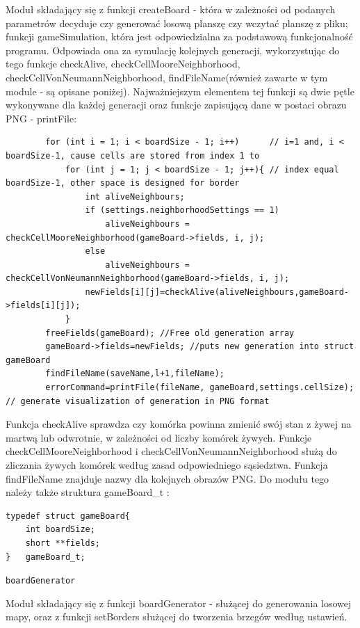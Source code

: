 \documentclass[a4paper,12pt,twoside]{article}
\newcommand{\prog}{\texttt}
\begin{document}
  \hspace{1.5cm} Moduł składający się z funkcji createBoard - która w zależności od podanych parametrów decyduje czy generować losową planszę czy wczytać planszę z pliku; funkcji gameSimulation, która jest odpowiedzialna za podstawową funkcjonalność programu. Odpowiada ona za symulację kolejnych generacji, wykorzystując do tego funkcje checkAlive, checkCellMooreNeighborhood, checkCellVonNeumannNeighborhood, findFileName(również zawarte w tym module - są opisane poniżej). Najważniejszym elementem tej funkcji są dwie pętle wykonywane dla każdej generacji oraz funkcje zapisującą dane w postaci obrazu PNG - printFile:
  \begin{lstlisting}
        for (int i = 1; i < boardSize - 1; i++)      // i=1 and, i < boardSize-1, cause cells are stored from index 1 to 
            for (int j = 1; j < boardSize - 1; j++){ // index equal boardSize-1, other space is designed for border
                int aliveNeighbours;
                if (settings.neighborhoodSettings == 1)
                    aliveNeighbours = checkCellMooreNeighborhood(gameBoard->fields, i, j);
                else
                    aliveNeighbours = checkCellVonNeumannNeighborhood(gameBoard->fields, i, j);
                newFields[i][j]=checkAlive(aliveNeighbours,gameBoard->fields[i][j]);
            }
        freeFields(gameBoard); //Free old generation array
        gameBoard->fields=newFields; //puts new generation into struct gameBoard
        findFileName(saveName,l+1,fileName);
        errorCommand=printFile(fileName, gameBoard,settings.cellSize); // generate visualization of generation in PNG format
\end{lstlisting}
Funkcja checkAlive sprawdza czy komórka powinna zmienić swój stan  z żywej na martwą lub odwrotnie, w zależności od liczby komórek żywych.
Funkcje checkCellMooreNeighborhood i checkCellVonNeumannNeighborhood służą do zliczania żywych komórek według zasad odpowiedniego sąsiedztwa.
Funkcja findFileName znajduje nazwy dla kolejnych obrazów PNG.
Do modułu tego należy także struktura gameBoard\_t :
\begin{lstlisting}
typedef struct gameBoard{
    int boardSize;
    short **fields;
}   gameBoard_t;
\end{lstlisting}
  \prog{boardGenerator} 

  \hspace{1.5cm} Moduł składający się z funkcji boardGenerator - służącej do generowania losowej mapy, oraz z funkcji setBorders służącej do tworzenia brzegów według ustawień.
\end{document}

